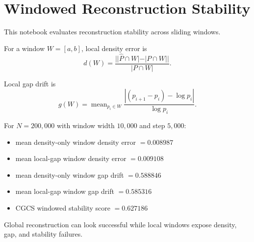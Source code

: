 \section*{Windowed Reconstruction Stability}

This notebook evaluates reconstruction stability across sliding windows.

For a window $W=[a,b]$, local density error is
\[
d(W)=\frac{||\hat{P}\cap W|-|P\cap W||}{|P\cap W|}.
\]

Local gap drift is
\[
g(W)=\operatorname{mean}_{p_i\in W}
\frac{|(p_{i+1}-p_i)-\log p_i|}{\log p_i}.
\]

For $N=200,000$ with window width $10,000$ and step $5,000$:
\begin{itemize}
  \item mean density-only window density error $= 0.008987$
  \item mean local-gap window density error $= 0.009108$
  \item mean density-only window gap drift $= 0.588846$
  \item mean local-gap window gap drift $= 0.585316$
  \item CGCS windowed stability score $= 0.627186$
\end{itemize}

Global reconstruction can look successful while local windows expose density, gap, and stability failures.
